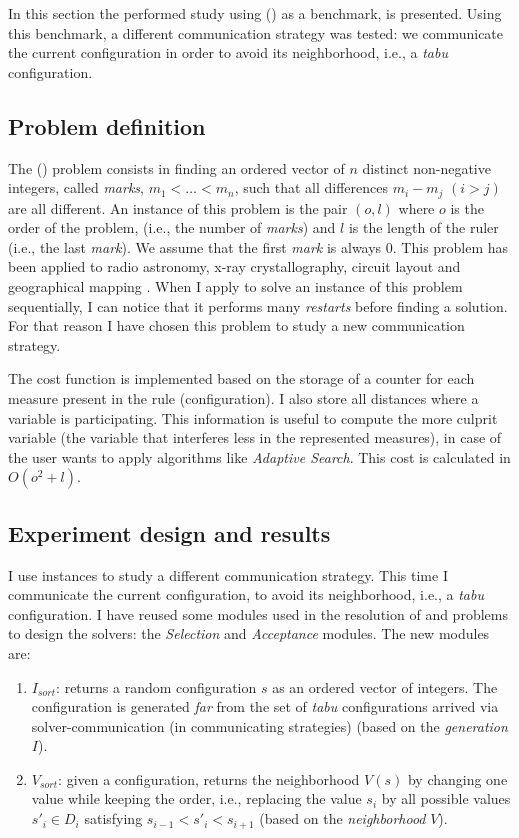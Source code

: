In this section the performed study using \grp{} (\GRP) as a benchmark, is presented. Using this benchmark, a different communication strategy was tested: we communicate the current configuration in order to avoid its neighborhood, i.e., a {\it tabu} configuration.

\subsection{Problem definition}

The \grp{} (\GRP) problem consists in finding an ordered vector of $n$ distinct non-negative integers, called \textit{marks}, $m_1 < \dots < m_n$, such that all differences $m_i - m_j$ $(i > j)$ are all different. An instance of this problem is the pair $(o,l)$ where $o$ is the order of the problem, (i.e., the number of \textit{marks}) and $l$ is the length of the ruler (i.e., the last {\it mark}). We assume that the first \textit{mark} is always 0. This problem has been applied to radio astronomy, x-ray crystallography, circuit layout and geographical mapping \cite{Soliday1995}. 
When I apply \posl{} to solve an instance of this problem sequentially, I can notice that it performs many {\it restarts} before finding a solution. For that reason I have chosen this problem to study a new communication strategy.

The cost function is implemented based on the storage of a counter for each measure present in the rule (configuration). I also store all distances where a variable is participating. This information is useful to compute the more culprit variable (the variable that interferes less in the represented measures), in case of the user wants to apply algorithms like {\it Adaptive Search}. This cost is calculated in $O\left(o^2 + l\right)$.

\subsection{Experiment design and results}

I use \grp{} instances to study a different communication strategy. This time I communicate the current configuration, to avoid its neighborhood, i.e., a {\it tabu} configuration. I have reused some modules used in the resolution of \sg{} and \carr{} problems to design the solvers: the \textit{Selection} and \textit{Acceptance} modules. The new modules are:

\begin{enumerate}
	\item$I_{sort}$: returns a random configuration $s$ as an ordered vector of integers. The configuration is generated \textit{far} from the set of {\it tabu} configurations arrived via solver-communication (in communicating strategies) (based on the \textit{generation} \absm{} $I$).
	\item $V_{sort}$: given a configuration, returns the neighborhood $V\left(s\right)$ by changing one value while keeping the order, i.e., replacing the value $s_i$ by all possible values $s'_i \in D_i$ satisfying $s_{i-1} < s'_i < s_{i+1}$ (based on the \textit{neighborhood} \absm{} $V$).
\end{enumerate}

